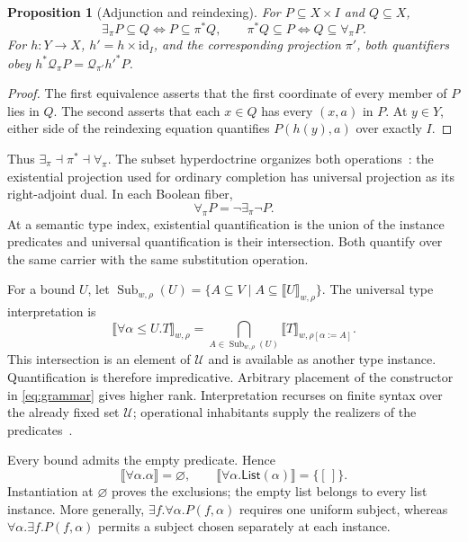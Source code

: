 \documentclass[10pt,a4paper]{article}
\newcommand{\sem}[1]{\llbracket #1\rrbracket}
\newcommand{\U}{\mathcal U}
\newcommand{\List}{\mathsf{List}}
\newtheorem{proposition}[definition]{Proposition}
\theoremstyle{remark}
\begin{document}
\begin{proposition}[Adjunction and reindexing]\label{prop:adjunction}
For $P\subseteq X\times I$ and $Q\subseteq X$,
\[
 \exists_\pi P\subseteq Q\iff P\subseteq\pi^*Q,
 \qquad
 \pi^*Q\subseteq P\iff Q\subseteq\forall_\pi P.
\]
For $h:Y\to X$, $h'=h\times\mathrm{id}_I$, and the corresponding projection
$\pi'$, both quantifiers obey
$h^*\mathcal Q_\pi P=\mathcal Q_{\pi'}h'^*P$.
\end{proposition}
\begin{proof}
The first equivalence asserts that the first coordinate of every member of $P$
lies in $Q$. The second asserts that each $x\in Q$ has every $(x,a)$ in $P$.
At $y\in Y$, either side of the reindexing equation quantifies $P(h(y),a)$
over exactly $I$.
\end{proof}

Thus $\exists_\pi\dashv\pi^*\dashv\forall_\pi$. The subset hyperdoctrine
organizes both operations~\cite{lawvere,mellies}: the existential projection
used for ordinary completion has universal projection as its right-adjoint
dual. In each Boolean fiber,
\begin{equation}\label{eq:duality}
 \forall_\pi P=\neg\exists_\pi\neg P.
\end{equation}
At a semantic type index, existential quantification is the union of the
instance predicates and universal quantification is their intersection.
Both quantify over the same carrier with the same substitution operation.

For a bound $U$, let
$\operatorname{Sub}_{w,\rho}(U)=
 \{A\subseteq V\mid A\subseteq\sem U_{w,\rho}\}$.
The universal type interpretation is
\begin{equation}\label{eq:poly}
 \sem{\forall\alpha\le U.T}_{w,\rho}
 =\bigcap_{A\in\operatorname{Sub}_{w,\rho}(U)}
       \sem T_{w,\rho[\alpha:=A]}.
\end{equation}
This intersection is an element of $\U$ and is available as another type
instance. Quantification is therefore impredicative. Arbitrary placement of the
constructor in \eqref{eq:grammar} gives higher rank. Interpretation recurses on
finite syntax over the already fixed set $\U$; operational inhabitants supply
the realizers of the predicates~\cite{pistone}.



Every bound admits the empty predicate. Hence
\[
 \sem{\forall\alpha.\alpha}=\varnothing,
 \qquad
 \sem{\forall\alpha.\List(\alpha)}=\{[\,]\}.
\]
Instantiation at $\varnothing$ proves the exclusions; the empty list belongs
to every list instance. More generally, $\exists f.\forall\alpha.P(f,\alpha)$
requires one uniform subject, whereas $\forall\alpha.\exists f.P(f,\alpha)$
permits a subject chosen separately at each instance.
\end{document}
